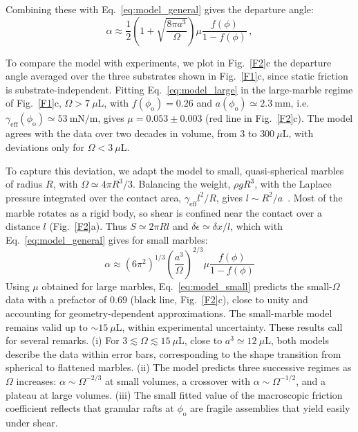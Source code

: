 \documentclass[twocolumn, prl,
 amsmath,amssymb,
 superscriptaddress,aps,
]{revtex4-2}
\begin{document}
Combining these with Eq.~\ref{eq:model_general} gives the departure angle:
\begin{equation}
    \alpha\approx  \frac{1}{2}\left({1+\sqrt{\frac{8\pi a^3}{\Omega}}}\right)\mu \frac{f(\phi)}{1-f(\phi)} \, ,
    \label{eq:model_large}
\end{equation}

To compare the model with experiments, we plot in Fig.~\ref{F2}c the departure angle averaged over the three substrates shown in Fig.~\ref{F1}c, since static friction is substrate-independent. Fitting Eq.~\ref{eq:model_large} in the large-marble regime of Fig.~\ref{F1}c, $\Omega>7~\mu$L, with $f(\phi_\mathrm{o})=0.26$ and $a(\phi_\mathrm{o})\simeq2.3~\mathrm{mm}$, i.e. $\gamma_\mathrm{eff}(\phi_\mathrm{o})\simeq53~\mathrm{mN/m}$, gives $\mu=0.053 \pm 0.003$ (red line in Fig.~\ref{F2}c). The model agrees with the data over two decades in volume, from $3$ to $300~\mu$L, with deviations only for $\Omega<3~\mu$L.

To capture this deviation, we adapt the model to small, quasi-spherical marbles of radius $R$, with $\Omega\simeq4\pi R^3/3$. Balancing the weight, $\rho gR^3$, with the Laplace pressure integrated over the contact area, $\gamma_{\mathrm{eff}}l^2/R$, gives $l\sim R^2/a$~\cite{mahadevan1999rolling}. Most of the marble rotates as a rigid body, so shear is confined near the contact over a distance $l$ (Fig.~\ref{F2}a). Thus $S\simeq2\pi Rl$ and $\delta\epsilon\simeq\delta x/l$, which with Eq.~\ref{eq:model_general} gives for small marbles:
\begin{equation}
    \alpha \approx \left({6\pi^2}\right)^{1/3} \left( \frac{a^3}{\Omega}\right) ^{2/3} \mu \frac{f(\phi)}{1-f(\phi)}
    \label{eq:model_small}
\end{equation}
Using $\mu$ obtained for large marbles, Eq.~\ref{eq:model_small} predicts the small-$\Omega$ data with a prefactor of $0.69$ (black line, Fig.~\ref{F2}c), close to unity and accounting for geometry-dependent approximations. The small-marble model remains valid up to $\sim15~\mu$L, within experimental uncertainty.
These results call for several remarks. (i) For $3\lesssim\Omega\lesssim15~\mu$L, close to $a^3\simeq12~\mu$L, both models describe the data within error bars, corresponding to the shape transition from spherical to flattened marbles. (ii) The model predicts three successive regimes as $\Omega$ increases: $\alpha\sim\Omega^{-2/3}$ at small volumes, a crossover with $\alpha\sim\Omega^{-1/2}$, and a plateau at large volumes.
(iii) The small fitted value of the macroscopic friction coefficient reflects that granular rafts at $\phi_\mathrm{o}$ are fragile assemblies that yield easily under shear.
\end{document}
